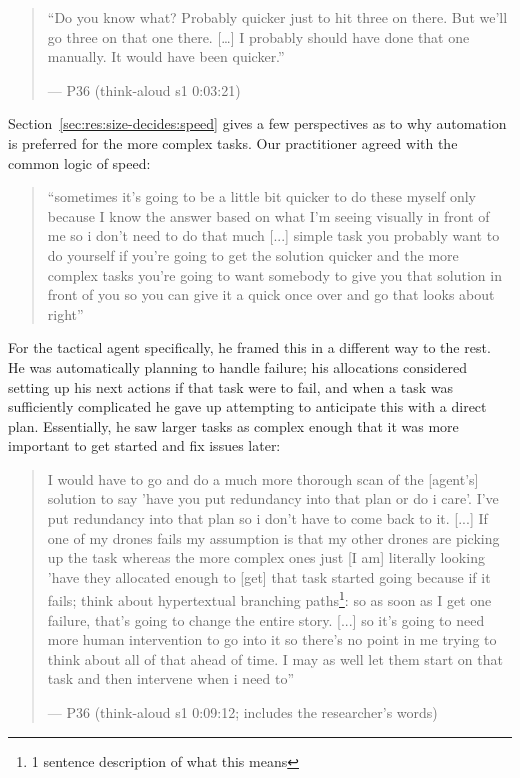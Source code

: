 \begin{quote}\small
``Do you know what? Probably quicker just to hit three on there. But we'll go three on that one there. [\ldots{}] I probably should have done that one manually. It would have been quicker.''\par\hfill--- P36 (think-aloud s1 0:03:21)
\end{quote}


Section~\ref{sec:res:size-decides:speed} gives a few perspectives as to why automation is preferred for the more complex tasks. Our practitioner agreed with the common logic of speed:

\begin{quote}\small
``sometimes it's going to be a little bit quicker to do these myself only because I know the answer based on what I'm seeing visually in front of me so i don't need to do that much [...] simple task you probably want to do yourself if you're going to get the solution quicker and the more complex tasks you're going to want somebody to give you that solution in front of you so you can give it a quick once over and go that looks about right''
\end{quote}

For the tactical agent specifically, he framed this in a different way to the rest. He was automatically planning to handle failure; his allocations considered setting up his next actions if that task were to fail, and when a task was sufficiently complicated he gave up attempting to anticipate this with a direct plan. Essentially, he saw larger tasks as complex enough that it was more important to get started and fix issues later:

\begin{quote}\small
I would have to go and do a much more thorough scan of the [agent's] solution to say 'have you put redundancy into that plan or do i care'. I've put redundancy into that plan so i don't have to come back to it. [...] If one of my drones fails my assumption is that my other drones are picking up the task whereas the more complex ones just [I am] literally looking 'have they allocated enough to [get] that task started going because if it fails; think about hypertextual branching paths\footnote{1 sentence description of what this means}: so as soon as I get one failure, that's going to change the entire story. [...] so it's going to need more human intervention to go into it so there's no point in me trying to think about all of that ahead of time. I may as well let them start on that task and then intervene when i need to''\par\hfill--- P36 (think-aloud s1 0:09:12; includes the researcher's words)
\end{quote}

